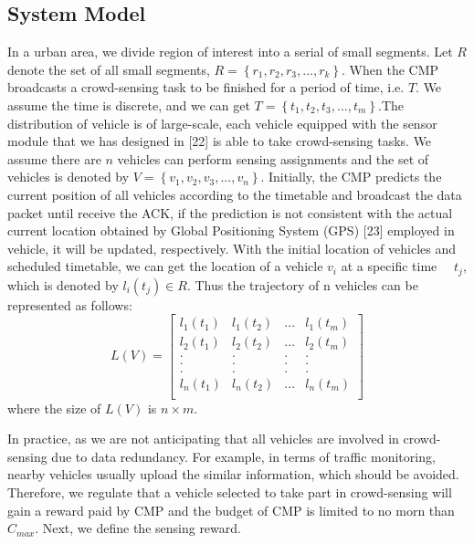 \documentclass[journal]{IEEEtran}
\begin{document}
\subsection{System Model }
In a urban area, we divide region of interest into a serial of small segments. Let $R$ denote the set of all small segments, $R=\left \{ r_{1},r_{2},r_{3},...,r_{k} \right \}$. When the CMP broadcasts a crowd-sensing task to be finished for a period of time, i.e. $T$. We assume the time is discrete, and we can get $T=\left \{ t_{1},t_{2},t_{3},...,t_{m} \right \}$.The distribution of vehicle is of large-scale, each vehicle equipped with the sensor module that we has designed in [22] is able to take crowd-sensing tasks. We assume there are $n$ vehicles can perform sensing assignments and the set of vehicles is denoted by $V=\left \{ v_{1},v_{2},v_{3},...,v_{n}\right \}$. Initially, the CMP predicts the current position of all vehicles according to the timetable and broadcast the data packet until receive the ACK, if the prediction is not consistent with the actual current location obtained by Global Positioning System (GPS) [23] employed in vehicle, it will be updated, respectively.  With the initial location of vehicles and scheduled timetable, we can get the location of a vehicle $v_{i}$ at a specific time　 $t_{j}$, which is denoted by  $l_{i}(t_{j})\in R$. Thus the trajectory of n vehicles can be represented as follows:
\setcounter{equation}{0}
\begin{equation}
L(V)=\begin{bmatrix}
l_{1}(t_{1})&l_{1}(t_{2})&... & l_{1}(t_{m})\\ 
l_{2}(t_{1})&l_{2}(t_{2})&... & l_{2}(t_{m})\\
.&. &.&.\\ 
.&. &.&.\\
.&. &.&.\\
l_{n}(t_{1})&l_{n}(t_{2})&... & l_{n}(t_{m})\\
\end{bmatrix}
\end{equation}
where the size of $L(V)$ is $n\times m$.


In practice, as we are not anticipating that all vehicles are involved in crowd-sensing due to data redundancy. For example, in terms of traffic monitoring, nearby vehicles usually upload the similar information, which should be avoided. Therefore, we regulate that a vehicle selected to take part in crowd-sensing will gain a reward paid by CMP and the budget of CMP is limited to no morn than $C_{max}$. Next, we define the sensing reward.
\end{document}
